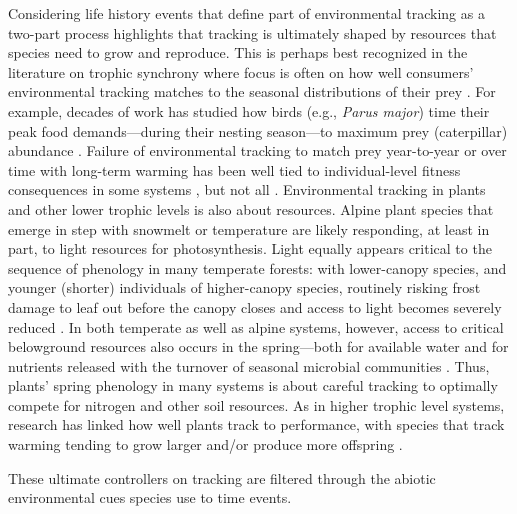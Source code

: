 \documentclass[11pt,letterpaper]{article}
\begin{document}
Considering life history events that define part of environmental tracking as a two-part process highlights that tracking is ultimately shaped by resources that species need to grow and reproduce. This is perhaps best recognized in the literature on trophic synchrony where focus is often on how well consumers' environmental tracking matches to the seasonal distributions of their prey \citep{deacy2018,kharouba2018}. For example, decades of work has studied how birds (e.g., \emph{Parus major}) time their peak food demands---during their nesting season---to maximum prey (caterpillar) abundance \citep[e.g.,][]{charm2008}. Failure of environmental tracking to match prey year-to-year or over time with long-term warming has been well tied to individual-level fitness consequences in some systems \citep{charm2008}, but not all \citep{visser2006}. Environmental tracking in plants and other lower trophic levels is also about resources. Alpine plant species that emerge in step with snowmelt or temperature are likely responding, at least in part, to light resources for photosynthesis. Light equally appears critical to the sequence of phenology in many temperate forests: with lower-canopy species, and younger (shorter) individuals of higher-canopy species, routinely risking frost damage to leaf out before the canopy closes and access to light becomes severely reduced \citep{Vitasse2013,heberling2019}. In both temperate as well as alpine systems, however, access to critical belowground resources also occurs in the spring---both for available water and for nutrients released with the turnover of seasonal microbial communities \citep{Zak:1990ar,edwards2010N}. Thus, plants' spring phenology in many systems is about careful tracking to optimally compete for nitrogen and other soil resources. As in higher trophic level systems, research has linked how well plants track to performance, with species that track warming tending to grow larger and/or produce more offspring \citep{Cleland:2012}.

These ultimate controllers on tracking are filtered through the abiotic environmental cues species use to time events. 
\end{document}
